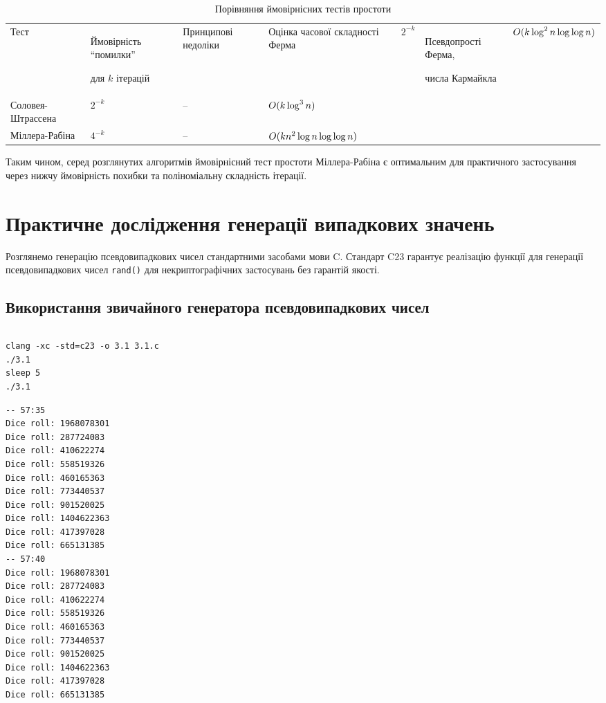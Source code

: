 \documentclass{kpi-lab}
\begin{document}
\bgroup
\renewcommand{\arraystretch}{1.2}
\begin{longtable}{l||l|l|l}
  \caption{Порівняння ймовірнісних тестів простоти}
  \label{table:primality-test-comparison}
  \\
  Тест                    & \parbox{23ex}{Ймовірність \enquote{помилки}\par для \(k\) ітерацій}  & Принципові недоліки                                   & Оцінка часової складності
  \bigskip\endhead
  Ферма                   & \(2^{-k}\)                                        & \parbox{20ex}{Псевдопрості Ферма,\par числа Кармайкла}                   & \(\mathnormal{O}(k \log^2 n \log\log n)\) \\
  Соловея-Штрассена       & \(2^{-k}\)                                        & --                                                                       & \(\mathnormal{O}(k \log^3 n)\)              \\
  Міллера-Рабіна          & \(4^{-k}\)                                        & --                                                                       & \(\mathnormal{O}(kn^2\log n \log\log n)\) \\
\end{longtable}
\egroup

Таким чином, серед розглянутих алгоритмів
ймовірнісний тест простоти Міллера-Рабіна є оптимальним для
практичного застосування через нижчу ймовірність похибки та
поліноміальну складність ітерації.

\chapter{Практичне дослідження генерації випадкових значень}

Розглянемо генерацію псевдовипадкових чисел стандартними
засобами мови C.
Стандарт C23 гарантує реалізацію функції для генерації
псевдовипадкових чисел \texttt{rand()} для
некриптографічних застосувань без гарантій якості.

\section{Використання звичайного генератора псевдовипадкових чисел}

\inputminted{c}{3.1.c}
\begin{verbatim}
clang -xc -std=c23 -o 3.1 3.1.c
./3.1
sleep 5
./3.1
\end{verbatim}
\begin{verbatim}
-- 57:35
Dice roll: 1968078301
Dice roll: 287724083
Dice roll: 410622274
Dice roll: 558519326
Dice roll: 460165363
Dice roll: 773440537
Dice roll: 901520025
Dice roll: 1404622363
Dice roll: 417397028
Dice roll: 665131385
-- 57:40
Dice roll: 1968078301
Dice roll: 287724083
Dice roll: 410622274
Dice roll: 558519326
Dice roll: 460165363
Dice roll: 773440537
Dice roll: 901520025
Dice roll: 1404622363
Dice roll: 417397028
Dice roll: 665131385
\end{verbatim}
\end{document}
